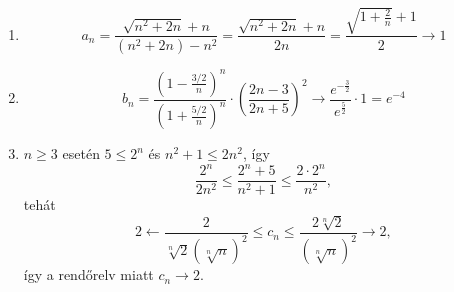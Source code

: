 \documentclass[11pt]{scrartcl}
\begin{document}
\begin{enumerate}
	\item \[
		      a_n
		      = \frac{\sqrt{n^2 + 2n} + n}{\left( n^2 + 2n \right) - n^2}
		      = \frac{\sqrt{n^2 + 2n} + n}{2n}
		      = \frac{\sqrt{1 + \frac{2}{n}} + 1}{2}
		      \to 1
	      \]

	\item \[
		      b_n
		      = \frac{\left(1 - \frac{3/2}{n}\right)^n}{\left(1 + \frac{5/2}{n}\right)^n}
		      \cdot \left( \frac{2n - 3}{2n + 5} \right)^2
		      \to \frac{e^{-\frac{3}{2}}}{e^{\frac{5}{2}}} \cdot 1
		      = e^{-4}
	      \]

	\item $n \ge 3$ esetén $5 \le 2^n$ és $n^2 + 1 \le 2n^2$, így
	      \[
		      \frac{2^n}{2n^2}
		      \le \frac{2^n + 5}{n^2 + 1}
		      \le \frac{2 \cdot 2^n}{n^2},
	      \]
	      tehát
	      \[
		      2
		      \leftarrow \frac{2}{\sqrt[n]{2} \left( \sqrt[n]{n} \right)^2}
		      \le c_n
		      \le \frac{2 \sqrt[n]{2}}{\left( \sqrt[n]{n} \right)^2}
		      \to 2,
	      \]
	      így a rendőrelv miatt $c_n \to 2$.
\end{enumerate}
\end{document}
